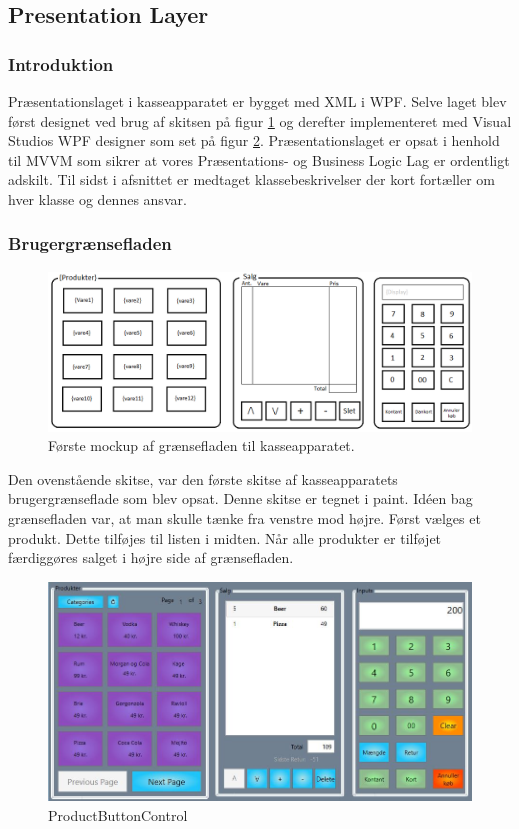 
\subsection{Presentation Layer}

\subsubsection{Introduktion}
Præsentationslaget i kasseapparatet er bygget med XML i WPF. Selve laget blev først designet ved brug af skitsen på figur \ref{fig:KasseMockup} og derefter implementeret med Visual Studios WPF designer som set på figur \ref{fig:EndeligeGUI}. Præsentationslaget er opsat i henhold til MVVM som sikrer at vores Præsentations- og Business Logic Lag er ordentligt adskilt. Til sidst i afsnittet er medtaget klassebeskrivelser der kort fortæller om hver klasse og dennes ansvar. \\

\subsubsection{Brugergrænsefladen}

\begin{figure}[H]
	\centering
	\includegraphics[width=1\textwidth]{Systemdesign/Frontend/pics/KasseMockup}
	\caption{Første mockup af grænsefladen til kasseapparatet.}
	\label{fig:KasseMockup}
\end{figure}

Den ovenstående skitse, var den første skitse af kasseapparatets brugergrænseflade som blev opsat. Denne skitse er tegnet i paint. Idéen bag grænsefladen var, at man skulle tænke fra venstre mod højre. Først vælges et produkt. Dette tilføjes til listen i midten. Når alle produkter er tilføjet færdiggøres salget i højre side af grænsefladen.

\begin{figure}[H]
	\centering
	\includegraphics[width=1\textwidth]{Systemdesign/Frontend/pics/GUI}
	\caption{ProductButtonControl}
	\label{fig:EndeligeGUI}
\end{figure}

